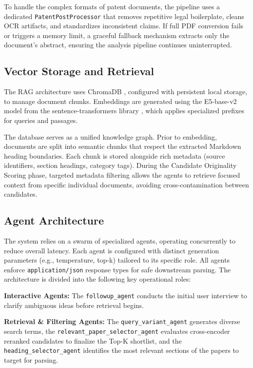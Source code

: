 To handle the complex formats of patent documents, the pipeline uses a dedicated \texttt{PatentPostProcessor} that removes repetitive legal boilerplate, cleans OCR artifacts, and standardizes inconsistent claims. If full PDF conversion fails or triggers a memory limit, a graceful fallback mechanism extracts only the document's abstract, ensuring the analysis pipeline continues uninterrupted.

\subsection{Vector Storage and Retrieval}

The RAG architecture uses ChromaDB \citep{chroma}, configured with persistent local storage, to manage document chunks. Embeddings are generated using the E5-base-v2 model from the sentence-transformers library \citep{wang2022e5}, which applies specialized prefixes for queries and passages.

The database serves as a unified knowledge graph. Prior to embedding, documents are split into semantic chunks that respect the extracted Markdown heading boundaries. Each chunk is stored alongside rich metadata (source identifiers, section headings, category tags). During the Candidate Originality Scoring phase, targeted metadata filtering allows the agents to retrieve focused context from specific individual documents, avoiding cross-contamination between candidates.

\subsection{Agent Architecture}

The system relies on a swarm of specialized agents, operating concurrently to reduce overall latency. Each agent is configured with distinct generation parameters (e.g., temperature, top-k) tailored to its specific role. All agents enforce \texttt{application/json} response types for safe downstream parsing. The architecture is divided into the following key operational roles:

\textbf{Interactive Agents:} The \texttt{followup\_\allowbreak agent} conducts the initial user interview to clarify ambiguous ideas before retrieval begins.

\textbf{Retrieval \& Filtering Agents:} The \texttt{query\_\allowbreak variant\_\allowbreak agent} generates diverse search terms, the \texttt{relevant\_\allowbreak paper\_\allowbreak selector\_\allowbreak agent} evaluates cross-encoder reranked candidates to finalize the Top-K shortlist, and the \texttt{heading\_\allowbreak selector\_\allowbreak agent} identifies the most relevant sections of the papers to target for parsing.

